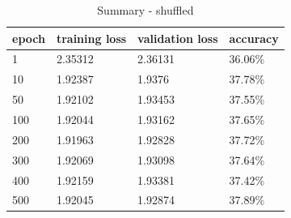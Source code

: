\begin{table}[ht]
\centering
\begin{tabular}{|l|l|l|l|}
\hline
\textbf{epoch} & \textbf{training loss} & \textbf{validation loss} & \textbf{accuracy} \\ \hline
1              & 2.35312                & 2.36131                  & 36.06\%           \\ \hline
10             & 1.92387                & 1.9376                   & 37.78\%           \\ \hline
50             & 1.92102                & 1.93453                  & 37.55\%           \\ \hline
100            & 1.92044                & 1.93162                  & 37.65\%           \\ \hline
200            & 1.91963                & 1.92828                  & 37.72\%           \\ \hline
300            & 1.92069                & 1.93098                  & 37.64\%           \\ \hline
400            & 1.92159                & 1.93381                  & 37.42\%           \\ \hline
500            & 1.92045                & 1.92874                  & 37.89\%           \\ \hline
\end{tabular}
\caption{Summary - shuffled}
\label{shuffled}
\end{table}

